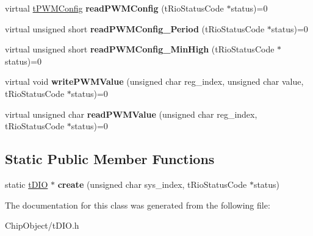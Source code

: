\begin{DoxyCompactItemize}
\item 
\hypertarget{classnFPGA_1_1nFRC__2012__1__6__4_1_1tDIO_a78f31e954751699bfd6df8c0f4a28b25}{
virtual \hyperlink{unionnFPGA_1_1nFRC__2012__1__6__4_1_1tDIO_1_1tPWMConfig}{tPWMConfig} {\bfseries readPWMConfig} (tRioStatusCode $\ast$status)=0}
\label{classnFPGA_1_1nFRC__2012__1__6__4_1_1tDIO_a78f31e954751699bfd6df8c0f4a28b25}

\item 
\hypertarget{classnFPGA_1_1nFRC__2012__1__6__4_1_1tDIO_a29f9a23a22f3424022e0cee2f9841272}{
virtual unsigned short {\bfseries readPWMConfig\_\-Period} (tRioStatusCode $\ast$status)=0}
\label{classnFPGA_1_1nFRC__2012__1__6__4_1_1tDIO_a29f9a23a22f3424022e0cee2f9841272}

\item 
\hypertarget{classnFPGA_1_1nFRC__2012__1__6__4_1_1tDIO_a89aedc9b69223ef0838b011d49c68c27}{
virtual unsigned short {\bfseries readPWMConfig\_\-MinHigh} (tRioStatusCode $\ast$status)=0}
\label{classnFPGA_1_1nFRC__2012__1__6__4_1_1tDIO_a89aedc9b69223ef0838b011d49c68c27}

\item 
\hypertarget{classnFPGA_1_1nFRC__2012__1__6__4_1_1tDIO_add45b2486779ed4995a1719918752e62}{
virtual void {\bfseries writePWMValue} (unsigned char reg\_\-index, unsigned char value, tRioStatusCode $\ast$status)=0}
\label{classnFPGA_1_1nFRC__2012__1__6__4_1_1tDIO_add45b2486779ed4995a1719918752e62}

\item 
\hypertarget{classnFPGA_1_1nFRC__2012__1__6__4_1_1tDIO_a2aba6f0b173eebbeb3c27a39ad152638}{
virtual unsigned char {\bfseries readPWMValue} (unsigned char reg\_\-index, tRioStatusCode $\ast$status)=0}
\label{classnFPGA_1_1nFRC__2012__1__6__4_1_1tDIO_a2aba6f0b173eebbeb3c27a39ad152638}

\end{DoxyCompactItemize}
\subsection*{Static Public Member Functions}
\begin{DoxyCompactItemize}
\item 
\hypertarget{classnFPGA_1_1nFRC__2012__1__6__4_1_1tDIO_a7a24710fe46dfb4e9808915c88624366}{
static \hyperlink{classnFPGA_1_1nFRC__2012__1__6__4_1_1tDIO}{tDIO} $\ast$ {\bfseries create} (unsigned char sys\_\-index, tRioStatusCode $\ast$status)}
\label{classnFPGA_1_1nFRC__2012__1__6__4_1_1tDIO_a7a24710fe46dfb4e9808915c88624366}

\end{DoxyCompactItemize}


The documentation for this class was generated from the following file:\begin{DoxyCompactItemize}
\item 
ChipObject/tDIO.h\end{DoxyCompactItemize}
